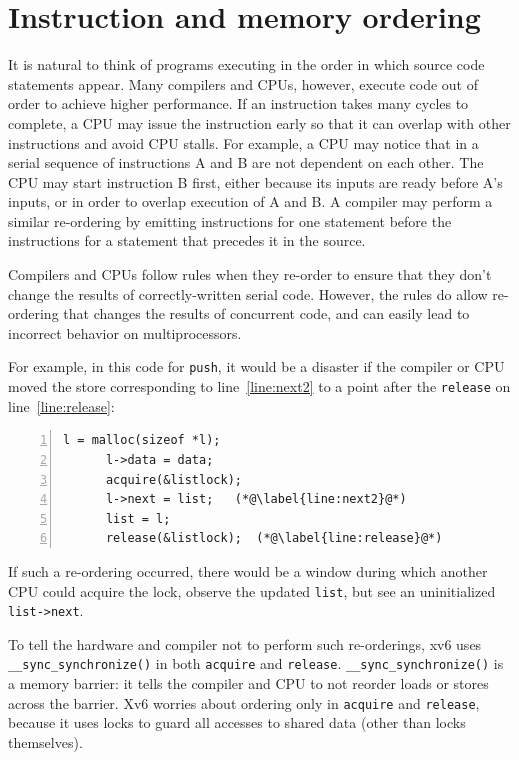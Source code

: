 \section{Instruction and memory ordering}

It is natural to think of programs executing in the order
in which source code statements appear.
Many
compilers and CPUs, however, execute code out of order
to achieve
higher performance.  If an instruction takes many cycles to complete,
a CPU may issue the instruction early so that it can
overlap with other instructions and avoid CPU stalls. For
example, a CPU may notice that in a serial sequence of
instructions A and B are not dependent on each other.
The CPU may start instruction B first, either because its
inputs are ready before A's inputs, or in order to overlap
execution of A and B.
A compiler may perform a similar re-ordering by emitting instructions
for one statement before the instructions for a statement that precedes it
in the source.

Compilers and CPUs follow rules when they re-order to
ensure that they don't change the results of correctly-written
serial code.
However, the rules do allow re-ordering that
changes the results of concurrent code,
and can easily lead to incorrect behavior on multiprocessors.

For example, in this code for
\lstinline{push},
it would be a disaster if the compiler or CPU moved the
store corresponding to
line~\ref{line:next2} to a point after the
\lstinline{release}
on line~\ref{line:release}:
\begin{lstlisting}[numbers=left,firstnumber=1]
      l = malloc(sizeof *l);
      l->data = data;
      acquire(&listlock);
      l->next = list;   (*@\label{line:next2}@*)
      list = l;      
      release(&listlock);  (*@\label{line:release}@*)
\end{lstlisting}
If such a re-ordering occurred, there would be a window during
which another CPU could acquire the lock,
observe the updated
\lstinline{list},
but see an uninitialized
\lstinline{list->next}.

To tell the hardware and compiler not to perform such re-orderings,
xv6 uses
\lstinline{__sync_synchronize()} 
in both
\lstinline{acquire}
and
\lstinline{release}.
\lstinline{__sync_synchronize()}
is a memory barrier:
it tells the compiler and CPU to not reorder loads or stores across the
barrier.
Xv6 worries about ordering only in
\lstinline{acquire}
and
\lstinline{release},
because it uses locks to guard all accesses to shared data (other than locks
themselves).
